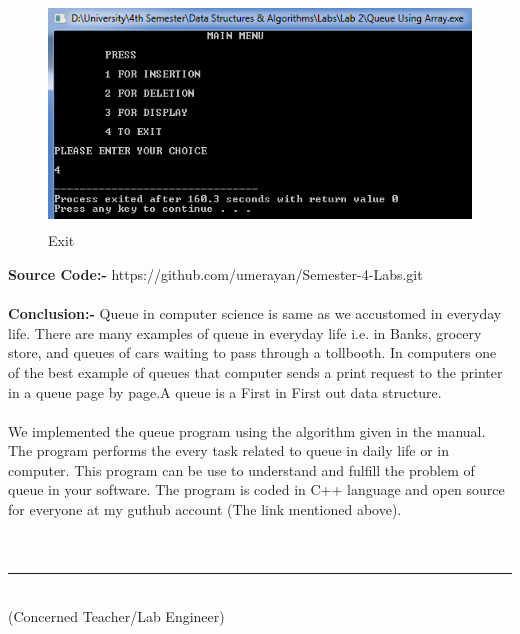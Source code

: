 \documentclass[11pt]{article}            %
\newcommand\tab[1][1cm]{\hspace*{#1}}
\begin{document}
\begin{figure}[H]
\centering
  \includegraphics[width=12cm,height=6cm,keepaspectratio]{7.png}
\caption{Exit}
\label{Figure:7}    
\end{figure}

\textbf{Source Code:-}
https://github.com/umerayan/Semester-4-Labs.git\\~\\

\textbf{Conclusion:-}
Queue in computer science is same as we accustomed in everyday life. There are many examples of queue in everyday life i.e. in Banks, grocery store, and queues of cars waiting to pass through a tollbooth.
In computers one of the best example of queues that computer sends a print request to the printer in a queue page by page.A queue is a First in First out data structure.\\~\\
We implemented the queue program using the algorithm given in the manual. The program performs the every task related to queue in daily life or in computer. This program can be use to understand and fulfill the problem of queue in your software.
The program is coded in C++ language and open source for everyone at my guthub account (The link mentioned above).\\~\\~\\

\tab[6cm] \noindent\rule{6cm}{0.4pt}\\
\tab[6cm] (Concerned Teacher/Lab Engineer)
 
\end{document}
